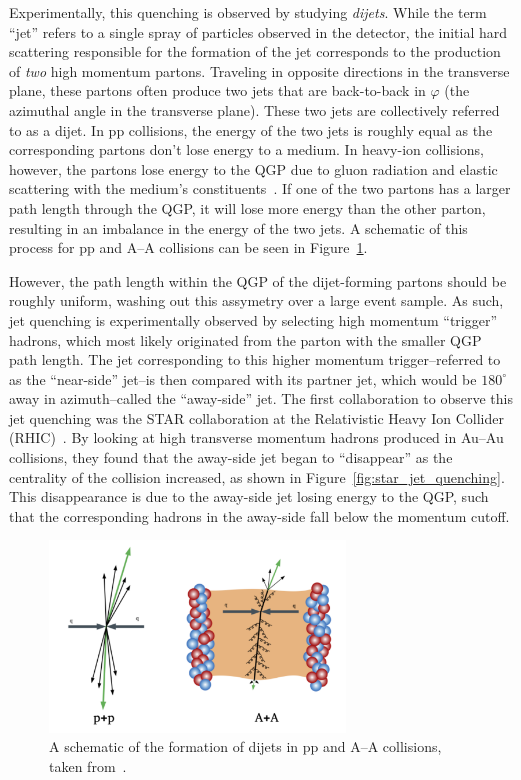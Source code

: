 Experimentally, this quenching is observed by studying \textit{dijets}. While the term ``jet'' refers to a single spray of particles observed in the detector, the initial hard scattering responsible for the formation of the jet corresponds to the production of \textit{two} high momentum partons. Traveling in opposite directions in the transverse plane, these partons often produce two jets that are back-to-back in $\varphi$ (the azimuthal angle in the transverse plane). These two jets are collectively referred to as a dijet. In pp collisions, the energy of the two jets is roughly equal as the corresponding partons don't lose energy to a medium. In heavy-ion collisions, however, the partons lose energy to the QGP due to gluon radiation and elastic scattering with the medium's constituents~\cite{JetQuenchingReview}. If one of the two partons has a larger path length through the QGP, it will lose more energy than the other parton, resulting in an imbalance in the energy of the two jets. A schematic of this process for pp and A--A collisions can be seen in Figure~\ref{fig:dijet_schematic}. 

However, the path length within the QGP of the dijet-forming partons should be roughly uniform, washing out this assymetry over a large event sample. As such, jet quenching is experimentally observed by selecting high momentum ``trigger'' hadrons, which most likely originated from the parton with the smaller QGP path length. The jet corresponding to this higher momentum trigger--referred to as the ``near-side'' jet--is then compared with its partner jet, which would be $180^\circ$ away in azimuth--called the ``away-side'' jet. The first collaboration to observe this jet quenching was the STAR collaboration at the Relativistic Heavy Ion Collider (RHIC)~\cite{STARJetQuenching}. By looking at high transverse momentum hadrons produced in Au--Au collisions, they found that the away-side jet began to ``disappear'' as the centrality of the collision increased, as shown in Figure~\ref{fig:star_jet_quenching}. This disappearance is due to the away-side jet losing energy to the QGP, such that the corresponding hadrons in the away-side fall below the momentum cutoff.

\begin{figure}[ht]
    \centering
    \includegraphics[width=0.7\textwidth]{figures/introduction/dijet_schematic.png}
    \caption{A schematic of the formation of dijets in pp and A--A collisions, taken from~\cite{DijetSchematic}.}
    \label{fig:dijet_schematic}
\end{figure}

